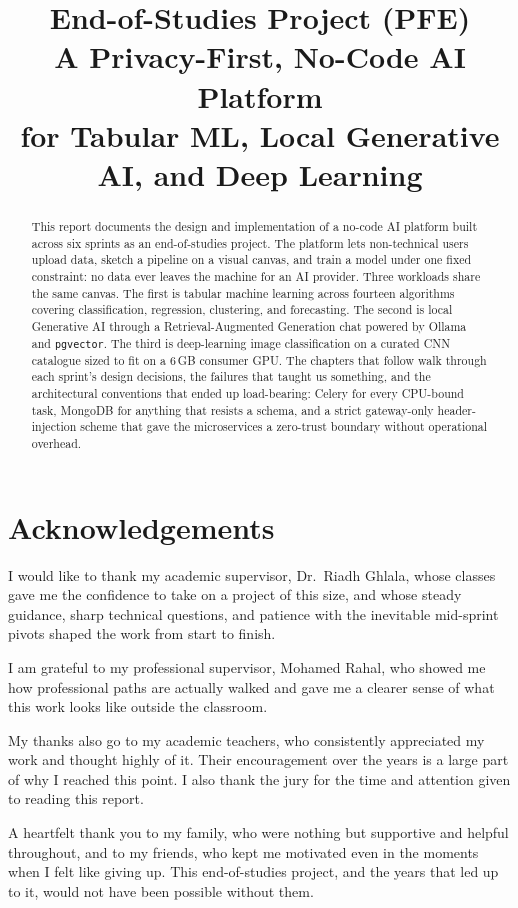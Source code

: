 \documentclass[12pt, a4paper, oneside]{report}
\title{End-of-Studies Project (PFE)\\[6pt] \Large A Privacy-First, No-Code AI Platform\\ \large for Tabular ML, Local Generative AI, and Deep Learning}
\author{}
\date{}
\begin{document}
\maketitle

\chapter*{Acknowledgements}

I would like to thank my academic supervisor, Dr.~Riadh Ghlala,
whose classes gave me the confidence to take on a project of this
size, and whose steady guidance, sharp technical questions, and
patience with the inevitable mid-sprint pivots shaped the work from
start to finish.

I am grateful to my professional supervisor, Mohamed Rahal, who
showed me how professional paths are actually walked and gave me a
clearer sense of what this work looks like outside the classroom.

My thanks also go to my academic teachers, who consistently
appreciated my work and thought highly of it. Their encouragement
over the years is a large part of why I reached this point. I also
thank the jury for the time and attention given to reading this
report.

A heartfelt thank you to my family, who were nothing but supportive
and helpful throughout, and to my friends, who kept me motivated even
in the moments when I felt like giving up. This end-of-studies
project, and the years that led up to it, would not have been
possible without them.

\newpage

\begin{abstract}
This report documents the design and implementation of a no-code AI
platform built across six sprints as an end-of-studies project. The
platform lets non-technical users upload data, sketch a pipeline on a
visual canvas, and train a model under one fixed constraint: no data
ever leaves the machine for an AI provider. Three workloads share the
same canvas. The
first is tabular machine learning across fourteen algorithms covering
classification, regression, clustering, and forecasting. The second is
local Generative AI through a Retrieval-Augmented Generation chat
powered by Ollama and \texttt{pgvector}. The third is deep-learning
image classification on a curated CNN catalogue sized to fit on a 6\,GB
consumer GPU. The chapters that follow walk through each sprint's
design decisions, the failures that taught us something, and the
architectural conventions that ended up load-bearing: Celery for every
CPU-bound task, MongoDB for anything that resists a schema, and a
strict gateway-only header-injection scheme that gave the
microservices a zero-trust boundary without operational overhead.
\end{abstract}
\end{document}
